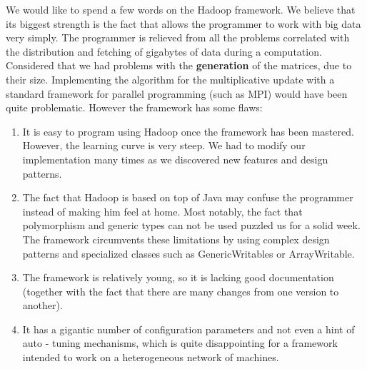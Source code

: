 We would like to spend a few words on the Hadoop framework.
We believe that its biggest strength is the fact that allows the programmer to work with big data very simply.
The programmer is relieved from all the problems correlated with the distribution and fetching of gigabytes of data during a computation.
Considered that we had problems with the \textbf{generation} of the matrices, due to their size.
Implementing the algorithm for the multiplicative update with a standard framework for parallel programming (such as MPI) would have been quite problematic.
However the framework has some flaws:
\begin{enumerate}
\item It is easy to program using Hadoop once the framework has been mastered. 
However, the learning curve is very steep. 
We had to modify our implementation many times as we discovered new features and design patterns.
\item The fact that Hadoop is based on top of Java may confuse the programmer instead of making him feel at home. 
Most notably, the fact that polymorphism and generic types can not be used puzzled us for a solid week.
The framework circumvents these limitations by using complex design patterns and specialized classes such as GenericWritables or ArrayWritable.
\item The framework is relatively young, so it is lacking good documentation (together with the fact that there are many changes from one version to another).
\item It has a gigantic number of configuration parameters and not even a hint of auto - tuning mechanisms, which is quite disappointing for a framework intended to work on a heterogeneous network of machines.
\end{enumerate}


